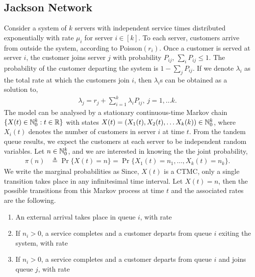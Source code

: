 \documentclass[a4paper,10pt,english]{article}
\begin{document}
\subsection{Jackson Network}
Consider a system of $k$ servers with independent service times distributed exponentially with rate $\mu_i$ for server $i \in [k]$.  
To each server, customers arrive from outside the system, according to Poisson$(r_i)$. Once a customer is served at server $i$, the customer joins server $j$ with probability $P_{ij}$, $\sum_{i}P_{ij} \leq 1$. The probability of the customer departing the system is $1-\sum_{j}P_{ij}$. If we denote $\lambda_i$ as the total rate at which the customers join $i$, then $\lambda_i$s can be obtained as a solution to,
\begin{align*}
\lambda_j=r_j+\sum_{i=1}^{k}\lambda_i P_{ij},~ j=1, \dots k.
\end{align*}
The model can be analysed by a stationary continuous-time Markov chain $\{X(t) \in \mathbb{N}_0^k: t \in \mathbb{R}\}$ with states $X(t) = (X_1(t),X_2(t), \dots X_k(k)) \in \mathbb{N}_0^k$, 
where $X_i(t)$ denotes the number of customers in server $i$ at time $t$. 
From the tandem queue results, we expect the customers at each server to be independent random variables. 
Let $n \in \mathbb{N}_0^k$, and we are interested in knowing the the joint probability,
\begin{align*}
\pi(n) &\triangleq \Pr\{X(t) = n\} = \Pr\{X_1(t) = n_1, \dots, X_k(t) = n_k\}.
\end{align*}
We write the marginal probabilities as 
Since, $X(t)$ is a CTMC, only a single transition takes place in any infinitesimal time interval. 
Let $X(t) = n$, then the possible transitions from this Markov process at time $t$ and the associated rates are the following.  
\begin{enumerate}[i\_]
\item An external arrival takes place in queue $i$, with rate 
\item If $n_i > 0$, a service completes and a customer departs from queue $i$ exiting the system, with rate 
\item If $n_i > 0$, a service completes and a customer departs from queue $i$ and joins queue $j$, with rate 
\end{enumerate}
\end{document}
